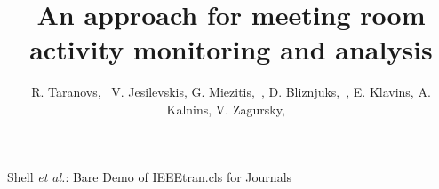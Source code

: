 \documentclass[journal]{IEEEtran}
\begin{document}
%
\title{An approach for meeting room activity monitoring and analysis}
%
%
%

\author{R. Taranovs,~
        V. Jesilevskis,
        G. Miezitis,~,
        D. Bliznjuks,~,
        E. Klavins,
        A. Kalnins,
        V. Zagursky, ~}

% 
%



%
{Shell \MakeLowercase{\textit{et al.}}: Bare Demo of IEEEtran.cls for Journals}
% 
\end{document}
